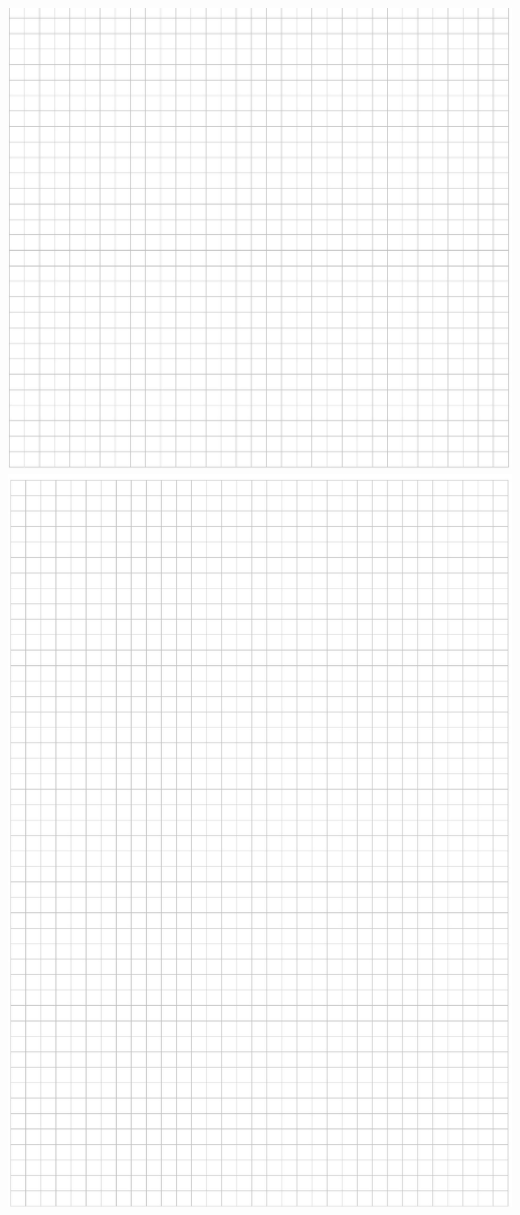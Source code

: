 \documentclass[10pt]{article}
\begin{document}
\includegraphics[max width=\textwidth, center]{2024_11_21_6a8be49478f78d0689cfg-16(2)}\\
\includegraphics[max width=\textwidth, center]{2024_11_21_6a8be49478f78d0689cfg-17}
\end{document}
